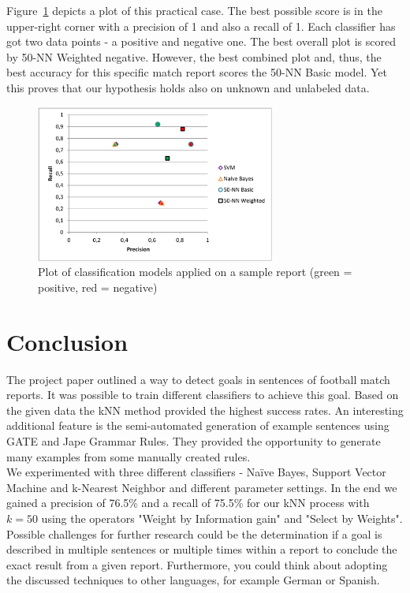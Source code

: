 \documentclass[11pt,titlepage,oneside,openany]{book}
\begin{document}
Figure~\ref{fig.plot} depicts a plot of this practical case. The best possible score is in the upper-right corner with a precision of 1 and also a recall of 1. Each classifier has got two data points - a positive and negative one. The best overall plot is scored by 50-NN Weighted negative. However, the best combined plot and, thus, the best accuracy for this specific match report scores the 50-NN Basic model. Yet this proves that our hypothesis holds also on unknown and unlabeled data.

\begin{figure} [h!]
\centering
\includegraphics[width=0.7\textwidth]{precRecall.PNG}
\caption{Plot of classification models applied on a sample report (green = positive, red = negative)}
\label{fig.plot}
\end{figure}

\section{Conclusion}
The project paper outlined a way to detect goals in sentences of football match reports. It was possible to train different classifiers to achieve this goal. Based on the given data the kNN method provided the highest success rates. An interesting additional feature is the semi-automated generation of example sentences using GATE and Jape Grammar Rules. They provided the opportunity to generate many examples from some manually created rules.\\
We experimented with three different classifiers - Na\"{i}ve Bayes, Support Vector Machine and k-Nearest Neighbor and different parameter settings. In the end we gained a precision of 76.5\% and a recall of 75.5\% for our kNN process with $k = 50$ using the  operators "Weight by Information gain" and "Select by Weights".\\
Possible challenges for further research could be the determination if a goal is described in multiple sentences or multiple times within a report to conclude the exact result from a given report. Furthermore, you could think about adopting the discussed techniques to other languages, for example German or Spanish. 



\end{document}
